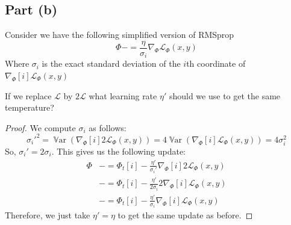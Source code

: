 \documentclass{amsart}
\newcommand{\cL}{\mathcal{L}}
\DeclareMathOperator{\Var}{\mathbb{V}ar}  %
\theoremstyle{definition}
\begin{document}
\subsection*{Part (b)} Consider we have the following simplified version of RMSprop 
\[
\Phi -= \frac{\eta}{\sigma_i} \nabla_\Phi \cL_\Phi(x, y)
\]
Where $\sigma_i$ is the exact standard deviation of the $i$th coordinate of $\nabla_\Phi[i] \cL_\Phi(x,y)$

If we replace $\cL$ by $2\cL$ what learning rate $\eta'$ should we use to get the same temperature?

\begin{proof}
    We compute $\sigma_i$ as follows:
    \[
    \sigma_i'^2 = \Var{(\nabla_\Phi[i] 2 \cL_\Phi(x, y))} = 4 \Var{(\nabla_\Phi[i] \cL_\Phi(x, y))} = 4 \sigma_i^2
    \]
    So, $\sigma_i' = 2 \sigma_i$. This gives us the following update:
    \begin{align*}
        \Phi &-= \Phi_t[i] - \frac{\eta'}{\sigma_i'} \nabla_\Phi[i] 2 \cL_\Phi(x, y)\\
        &-= \Phi_t[i] - \frac{\eta'}{2\sigma_i} 2 \nabla_\Phi[i] \cL_\Phi(x, y)\\
        &-= \Phi_t[i] - \frac{\eta'}{\sigma_i} \nabla_\Phi[i] \cL_\Phi(x, y)
    \end{align*}
    Therefore, we just take $\eta' = \eta$ to get the same update as before.
\end{proof}
\end{document}
